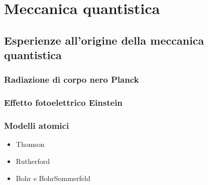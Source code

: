 \documentclass[letterpaper,10pt,italian]{jupyterBook}
\begin{document}
\sphinxstepscope


\chapter{Meccanica quantistica}
\label{\detokenize{ch/modern/quantum:meccanica-quantistica}}\label{\detokenize{ch/modern/quantum:physics-hs-modern-quantum}}\label{\detokenize{ch/modern/quantum::doc}}

\section{Esperienze all’origine della meccanica quantistica}
\label{\detokenize{ch/modern/quantum:esperienze-all-origine-della-meccanica-quantistica}}\label{\detokenize{ch/modern/quantum:physics-hs-modern-quantum-experience}}

\subsection{Radiazione di corpo nero \sphinxhyphen{} Planck}
\label{\detokenize{ch/modern/quantum:radiazione-di-corpo-nero-planck}}\label{\detokenize{ch/modern/quantum:physics-hs-modern-quantum-experience-black-body}}

\subsection{Effetto fotoelettrico \sphinxhyphen{} Einstein}
\label{\detokenize{ch/modern/quantum:effetto-fotoelettrico-einstein}}\label{\detokenize{ch/modern/quantum:physics-hs-modern-quantum-experience-pe-effect}}

\subsection{Modelli atomici}
\label{\detokenize{ch/modern/quantum:modelli-atomici}}\label{\detokenize{ch/modern/quantum:physics-hs-modern-quantum-experience-atoms}}\begin{itemize}
\item {} 
\sphinxAtStartPar
Thomson

\item {} 
\sphinxAtStartPar
Rutherford

\item {} 
\sphinxAtStartPar
Bohr e Bohr\sphinxhyphen{}Sommerfeld

\end{itemize}
\end{document}
